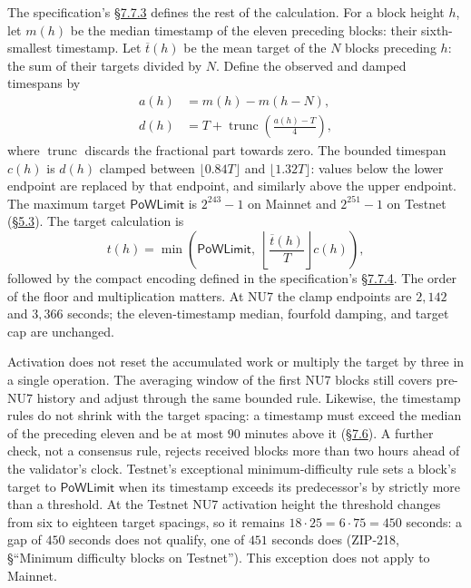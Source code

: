 \documentclass[11pt,a4paper]{article}
\theoremstyle{definition}
\begin{document}
The specification's
\href{https://zips.z.cash/protocol/protocol.pdf\#diffadjustment}{\S7.7.3}
defines the rest of the calculation. For a block height $h$, let
$m(h)$ be the median timestamp of the eleven preceding blocks: their
sixth-smallest timestamp. Let $\overline{t}(h)$ be the mean target of
the $N$ blocks preceding $h$: the sum of their targets divided by $N$.
Define the observed and damped timespans by
\begin{align*}
 a(h)&=m(h)-m(h-N),\\
 d(h)&=T+\operatorname{trunc}\!\left(\frac{a(h)-T}4\right),
\end{align*}
where $\operatorname{trunc}$ discards the fractional part towards zero.
The bounded timespan $c(h)$ is $d(h)$ clamped between
$\lfloor0.84T\rfloor$ and $\lfloor1.32T\rfloor$: values below the
lower endpoint are replaced by that endpoint, and similarly above the
upper endpoint. The maximum target $\mathsf{PoWLimit}$ is $2^{243}-1$ on
Mainnet and $2^{251}-1$ on Testnet
(\href{https://zips.z.cash/protocol/protocol.pdf\#constants}{\S5.3}).
The target calculation is
\[
  t(h)=\min\!\left(\mathsf{PoWLimit},\;
       \left\lfloor\frac{\overline{t}(h)}{T}\right\rfloor c(h)\right),
\]
followed by the compact encoding defined in the specification's
\href{https://zips.z.cash/protocol/protocol.pdf\#nbits}{\S7.7.4}.
The order of the floor and multiplication matters. At NU7 the clamp
endpoints are $2{,}142$ and $3{,}366$ seconds; the eleven-timestamp median,
fourfold damping, and target cap are unchanged.

Activation does not reset the accumulated work or multiply the target by
three in a single operation. The averaging window of the first NU7 blocks
still covers pre-NU7 history and adjust through the same bounded rule. Likewise,
the timestamp rules do not shrink with the target spacing: a timestamp must
exceed the median of the preceding eleven and be at most $90$ minutes
above it (\href{https://zips.z.cash/protocol/protocol.pdf\#blockheader}{\S7.6}).
A further check, not a consensus rule, rejects received blocks more than two
hours ahead of the validator's clock. Testnet's exceptional
minimum-difficulty rule sets a block's target to $\mathsf{PoWLimit}$ when its
timestamp exceeds its predecessor's by strictly more than a threshold. At
the Testnet NU7 activation height the threshold changes from six to
eighteen target spacings, so it remains $18\cdot25=6\cdot75=450$ seconds: a
gap of $450$ seconds does not qualify, one of $451$ seconds does (ZIP-218,
\S``Minimum difficulty blocks on Testnet''). This exception does not apply
to Mainnet.
\end{document}
